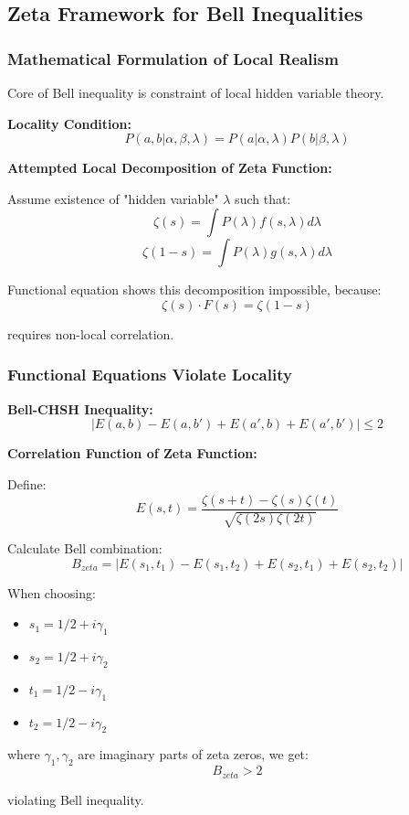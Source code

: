 \documentclass[11pt]{article}
\theoremstyle{plain}
\theoremstyle{definition}
\theoremstyle{remark}
\begin{document}
\subsection{Zeta Framework for Bell Inequalities}

\subsubsection{Mathematical Formulation of Local Realism}

Core of Bell inequality is constraint of local hidden variable theory.

\textbf{Locality Condition:}
$$P(a,b|\alpha,\beta,\lambda) = P(a|\alpha,\lambda) P(b|\beta,\lambda)$$

\textbf{Attempted Local Decomposition of Zeta Function:}

Assume existence of "hidden variable" $\lambda$ such that:
$$\zeta(s) = \int P(\lambda) f(s,\lambda) d\lambda$$
$$\zeta(1-s) = \int P(\lambda) g(s,\lambda) d\lambda$$

Functional equation shows this decomposition impossible, because:
$$\zeta(s) \cdot F(s) = \zeta(1-s)$$

requires non-local correlation.

\subsubsection{Functional Equations Violate Locality}

\textbf{Bell-CHSH Inequality:}
$$|E(a,b) - E(a,b') + E(a',b) + E(a',b')| \leq 2$$

\textbf{Correlation Function of Zeta Function:}

Define:
$$E(s,t) = \frac{\zeta(s+t) - \zeta(s)\zeta(t)}{\sqrt{\zeta(2s)\zeta(2t)}}$$

Calculate Bell combination:
$$B_{zeta} = |E(s_1,t_1) - E(s_1,t_2) + E(s_2,t_1) + E(s_2,t_2)|$$

When choosing:
\begin{itemize}
\item $s_1 = 1/2 + i\gamma_1$
\item $s_2 = 1/2 + i\gamma_2$
\item $t_1 = 1/2 - i\gamma_1$
\item $t_2 = 1/2 - i\gamma_2$
\end{itemize}

where $\gamma_1, \gamma_2$ are imaginary parts of zeta zeros, we get:
$$B_{zeta} > 2$$

violating Bell inequality.
\end{document}
